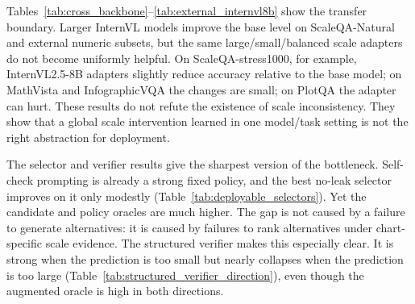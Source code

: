 Tables~\ref{tab:cross_backbone}--\ref{tab:external_internvl8b} show the transfer boundary. Larger InternVL models improve the base level on ScaleQA-Natural and external numeric subsets, but the same large/small/balanced scale adapters do not become uniformly helpful. On ScaleQA-stress1000, for example, InternVL2.5-8B adapters slightly reduce accuracy relative to the base model; on MathVista and InfographicVQA the changes are small; on PlotQA the adapter can hurt. These results do not refute the existence of scale inconsistency. They show that a global scale intervention learned in one model/task setting is not the right abstraction for deployment.

\begin{table}[h]
\centering
\small
\resizebox{\linewidth}{!}{}
\caption{InternVL scale adaptation on ScaleQA-Natural-520.}
\label{tab:internvl_adapter}
\end{table}

\begin{table}[h]
\centering
\small
\resizebox{\linewidth}{!}{}
\caption{InternVL2.5-8B on a synthetic ScaleQA-stress1000 set.}
\label{tab:internvl8b_stress}
\end{table}

\begin{table}[h]
\centering
\small

\caption{Training-free prompting baselines on ScaleQA-Natural-520.}
\label{tab:tta_baselines_app}
\end{table}

\begin{table}[h]
\centering
\small
\resizebox{\linewidth}{!}{}
\caption{Multi-candidate verifier on ScaleQA-Natural-520. Candidate oracle selects the best answer from the same candidate pool and is an upper bound.}
\label{tab:candidate_verifier}
\end{table}

The selector and verifier results give the sharpest version of the bottleneck. Self-check prompting is already a strong fixed policy, and the best no-leak selector improves on it only modestly (Table~\ref{tab:deployable_selectors}). Yet the candidate and policy oracles are much higher. The gap is not caused by a failure to generate alternatives: it is caused by failures to rank alternatives under chart-specific scale evidence. The structured verifier makes this especially clear. It is strong when the prediction is too small but nearly collapses when the prediction is too large (Table~\ref{tab:structured_verifier_direction}), even though the augmented oracle is high in both directions.

